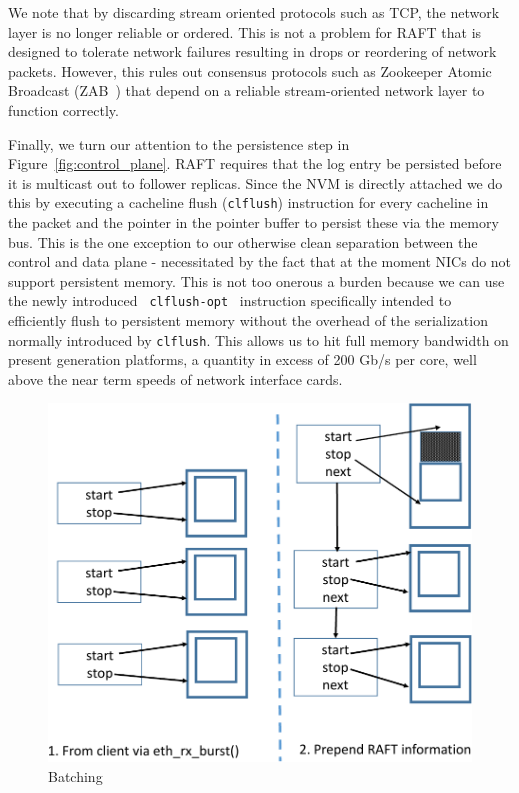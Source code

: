 \documentclass[pageno]{jpaper}
\begin{document}
We note that by discarding stream oriented protocols such as TCP, the network
layer is no longer reliable or ordered. This is not a problem for RAFT that is
designed to tolerate network failures resulting in drops or reordering of
network packets. However, this rules out consensus protocols such as Zookeeper
Atomic Broadcast (ZAB~\cite{zab}) that depend on a reliable stream-oriented
network layer to function correctly.

Finally, we turn our attention to the persistence step in
Figure~\ref{fig:control_plane}. RAFT requires that the log entry be persisted
before it is multicast out to follower replicas. Since the NVM is directly
attached we do this by executing a cacheline flush ({\tt clflush}) instruction
for every cacheline in the packet and the pointer in the pointer buffer to
persist these via the memory bus. This is the one exception to our otherwise
clean separation between the control and data plane - necessitated by the fact
that at the moment NICs do not support persistent memory. This is not too
onerous a burden because we can use the newly introduced {\tt
  clflush-opt}~\cite{clflush_opt} instruction specifically intended to
efficiently flush to persistent memory without the overhead of the serialization
normally introduced by {\tt clflush}. This allows us to hit full memory
bandwidth on present generation platforms, a quantity in excess of 200 Gb/s per
core, well above the near term speeds of network interface cards.

\begin{figure}
  \centering
  \includegraphics[scale=0.4]{figures2/batching.pdf}
  \caption{Batching}
  \label{fig:batching}
\end{figure}
\end{document}

